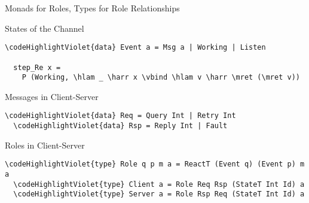 \documentclass{beamer}
\newcommand\codeHighlightGreen[1]{\textcolor[rgb]{0.1,0.7,0.1}{\textbf{#1}}}
\newcommand\codeHighlightViolet[1]{\textcolor[rgb]{0.6, 0, 0.6}{\textbf{#1}}}
\newcommand\codeHighlightOrange[1]{\textcolor[rgb]{0.9, 0.3, 0}{\textbf{#1}}}
\newcommand\vbind[0]{\codeHighlightGreen{>>=}}
\newcommand\mret[0]{\codeHighlightGreen{return}}
\newcommand\hlam[0]{\ensuremath{\backslash}}
\newcommand\harr[0]{\codeHighlightOrange{->}}
\begin{document}
\begin{frame}[fragile]{Monads for Roles, Types for Role Relationships}

\begin{structure}{States of the Channel}
 \begin{Verbatim}[commandchars=\\\{\}]
  \codeHighlightViolet{data} Event a = Msg a | Working | Listen

  step_Re x =
    P (Working, \hlam _ \harr x \vbind \hlam v \harr \mret (\mret v))
 \end{Verbatim}

\end{structure}


\begin{structure}{Messages in Client-Server}

 \begin{Verbatim}[commandchars=\\\{\}]
  \codeHighlightViolet{data} Req = Query Int | Retry Int
  \codeHighlightViolet{data} Rsp = Reply Int | Fault
 \end{Verbatim}

\end{structure}


\begin{structure}{Roles in Client-Server}

 \begin{Verbatim}[commandchars=\\\{\}]
  \codeHighlightViolet{type} Role q p m a = ReactT (Event q) (Event p) m a
  \codeHighlightViolet{type} Client a = Role Req Rsp (StateT Int Id) a
  \codeHighlightViolet{type} Server a = Role Rsp Req (StateT Int Id) a
 \end{Verbatim}

\end{structure}

\end{frame}
\end{document}
